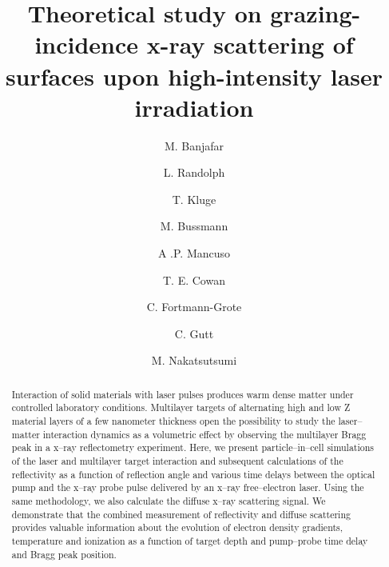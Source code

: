 \documentclass[preprint, 12pt]{elsarticle}
\begin{document}
\begin{frontmatter}



\title{Theoretical study on grazing-incidence x-ray scattering of  surfaces upon high-intensity laser irradiation}





\author[1]{M. Banjafar}
\author[2]{L. Randolph}
\author[3]{T. Kluge}
\author[3]{M. Bussmann}
\author[1]{A .P. Mancuso}
\author[3]{T. E. Cowan}
\author[1]{C. Fortmann-Grote}
\author[2]{C. Gutt}
\author[1]{M. Nakatsutsumi}


\address[1]{European XFEL GmbH, Holzkopple 4, 22869 Schenefeld, Germany}
\address[2]{Department of Physics, University of Siegen, D-57072 Siegen, Germany}
\address[3]{Helmholtz-Zentrum Dresden-Rossendorf, Bautzner Landstraße 400, 01328 Dresden, Germany}

\begin{abstract}
  Interaction of solid materials with laser pulses
  produces warm dense matter under controlled laboratory conditions.
  Multilayer targets of alternating high and low Z material layers of a few
  nanometer thickness open the possibility
  to study the laser--matter interaction dynamics as a volumetric effect by
  observing the multilayer Bragg peak in a x--ray reflectometry experiment.
  Here, we present particle--in--cell simulations of
  the laser and multilayer target interaction and subsequent calculations of
  the reflectivity as a
  function of reflection angle and various time delays between the optical pump
  and the x--ray probe pulse delivered by an x--ray free--electron laser.
  Using the same methodology, we also calculate the diffuse x--ray scattering
  signal.
  We demonstrate that the combined measurement of reflectivity and
  diffuse scattering provides valuable information about the evolution of
  electron density gradients, temperature and ionization as a function of target
  depth and pump--probe time delay and Bragg peak position.
\end{abstract}


\end{frontmatter}
\end{document}
